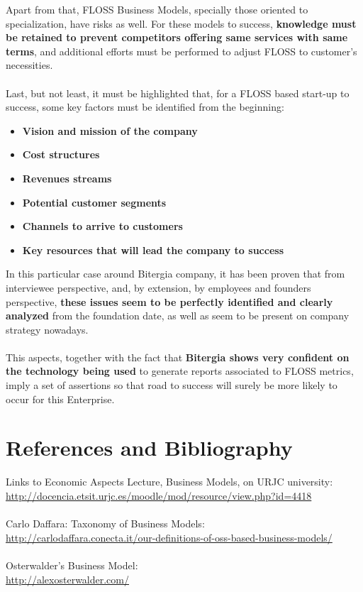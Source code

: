 \documentclass[11pt]{article}
\begin{document}
Apart from that, FLOSS Business Models, specially those oriented to specialization, have risks as well. For these models to success, \textbf{knowledge must be retained to prevent competitors offering same services with same terms}, and additional efforts must be performed to adjust FLOSS to customer's necessities.\\
\\
Last, but not least, it must be highlighted that, for a FLOSS based start-up to success, some key factors must be identified from the beginning:
\begin{itemize}\itemsep0.2pt
\item{\textbf{Vision and mission of the company}}
\item{\textbf{Cost structures}}
\item{\textbf{Revenues streams}}
\item{\textbf{Potential customer segments}}
\item{\textbf{Channels to arrive to customers}}
\item{\textbf{Key resources that will lead the company to success}}
\end{itemize}
In this particular case around Bitergia company, it has been proven that from interviewee perspective, and, by extension, by employees and founders perspective, \textbf{these issues seem to be perfectly identified and clearly analyzed} from the foundation date, as well as seem to be present on company strategy nowadays.\\
\\
This aspects, together with the fact that \textbf{Bitergia shows very confident on the technology being used} to generate reports associated to FLOSS metrics, imply a set of assertions so that road to success will surely be more likely to occur for this Enterprise.
\pagebreak
\section{References and Bibliography}
Links to Economic Aspects Lecture, Business Models, on URJC university:\\
\url{http://docencia.etsit.urjc.es/moodle/mod/resource/view.php?id=4418}\\
\\
Carlo Daffara: Taxonomy of Business Models:\\
\url{http://carlodaffara.conecta.it/our-definitions-of-oss-based-business-models/}\\
\\
Osterwalder's Business Model:\\
\url{http://alexosterwalder.com/}\\
\end{document}
